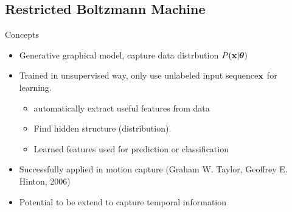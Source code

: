    \subsection{Restricted Boltzmann Machine}
	\begin{frame}[t]{Concepts}
	 \begin{itemize}
	  \itemsep10pt
	  \item Generative graphical model, capture data distrbution $P(\mathbf{x}|\boldsymbol{\theta})$
	  \item Trained in unsupervised way, only use unlabeled input sequence$\mathbf{x}$ for learning. 
		  \begin{itemize}
		   \item automatically extract useful features from data 
		   \item Find hidden structure (distribution). 
		   \item Learned features used for prediction or classification
		  \end{itemize}
	  \item Successfully applied in motion capture (Graham W. Taylor, Geoffrey E. Hinton, 2006)
	  \item Potential to be extend to capture temporal information
	 \end{itemize}


	

	\end{frame}
	
